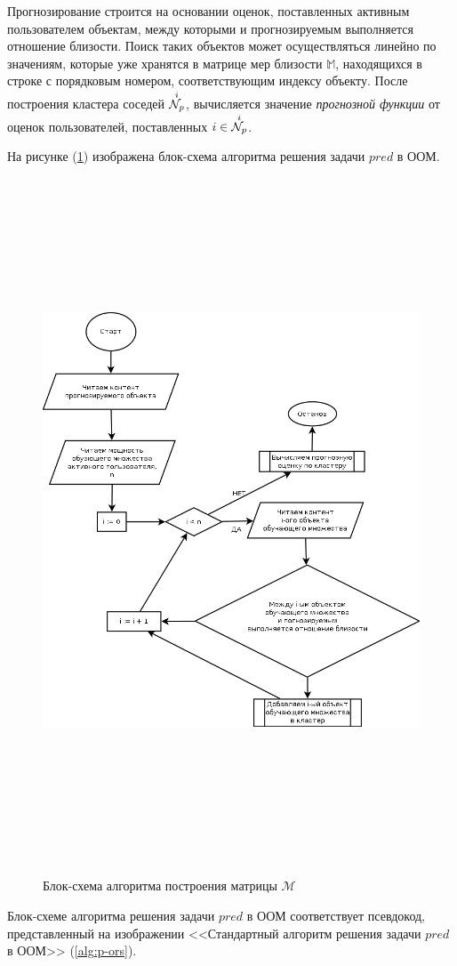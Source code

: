 Прогнозирование строится на основании оценок, поставленных активным пользователем
объектам, между которыми и прогнозируемым выполняется отношение близости.
Поиск таких объектов может осуществляться линейно по значениям, которые уже
хранятся в матрице мер близости $\mathbb{M}$, находящихся в строке с порядковым
номером, соответствующим индексу объекту. После построения кластера соседей
${\overset{i}{\mathcal{N}_p}}$,
вычисляется значение {\it прогнозной функции} от оценок пользователей,
поставленных $i \in {\overset{i}{\mathcal{N}_p}}$.


На рисунке (\ref{dia:p-ors}) изображена блок-схема алгоритма
решения задачи $pred$ в ООМ.
\begin{figure}[htb]
	\caption{Блок-схема алгоритма построения матрицы $\mathcal{M}$}
\begin{center}
	\label{dia:p-ors}
 \includegraphics[width=7in,height=8in]{pics/algs/p-ors.png}
\end{center}
\end{figure}
Блок-схеме алгоритма решения задачи $pred$ в ООМ соответствует
псевдокод, представленный на изображении <<Стандартный алгоритм решения задачи $pred$ в ООМ>>  (\ref{alg:p-ors}).

